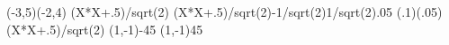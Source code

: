 \documentclass{jarticle}
\begin{document}
\begin{zahyou}[ul=10mm](-3,5)(-2,4)
  \zahyouMemori[g]%
  \def\Fx{(X*X+.5)/sqrt(2)}
  \YKinziOresen\Fx\xmin{}\oresen
  \YKinziOresen\Fx{-1/sqrt(2)}{1/sqrt(2)}{.05}\nurisen
  \edefappend{}
  \YGurafu(.1)(.05)\Fx\xmin\xmax
  \def\OO{(1,-1)}
  \kTyokusen\OO{-45}{}{}\Put{}
  \kTyokusen\OO{45}{}{}\Put{}
  \begin{azahyou}[\OO]\E\F
    \azTenretutoz\oresen\oresen
    \azTenretutoz\nurisen\nurisen
    \clipDrawline\oresen
    \Nuritubusi\nurisen
  \end{azahyou}
\end{zahyou}
\end{document}
